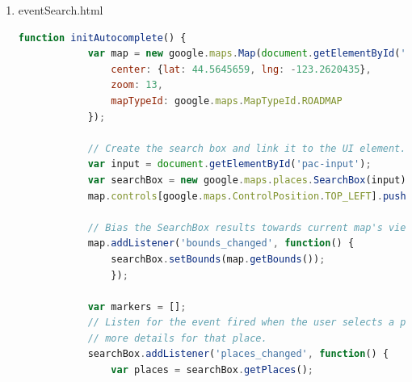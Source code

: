 \documentclass[letterpaper,10pt,onecolumn]{IEEEtran} %
\begin{document}
\begin{enumerate}
\begin{center}
\begin{lstlisting}[language=Python]
        url = "https://api.meetup.com/2/open_events?&sign=true&photo-host=public&state=ky&city=lexington&country=usa&topic=" + hashtag.name + "&radius=10000&sign=true&key=" + MEETUP_API_KEY

         try:
             #getting location of the events instead of groups show below - Justin Bruntmyer
             if 'venue' in meetup.keys():
                 if 'city' in meetup['venue'].keys():
                     event.city = meetup['venue']['city']
                 if 'country' in meetup['venue'].keys():
                     event.country = meetup['venue']['country']
                 if 'state' in meetup['venue'].keys():
                     event.state = meetup['venue']['state']
                 if 'address_1' in meetup['venue'].keys():
                     event.address_1 = meetup['venue']['address_1']
                 if 'lat' in meetup['venue'].keys():
                     event.latitude = meetup['venue']['lat']
                 if 'lon' in meetup['venue'].keys():
                     event.longitude = meetup['venue']['lon']
            #end getting locaiton info - Justin Bruntmyer
      \end{lstlisting}
    \end{center}

  \item eventSearch.html
    \begin{center}
      \begin{lstlisting}[language=JavaScript]
        function initAutocomplete() {
            var map = new google.maps.Map(document.getElementById('map'), {
                center: {lat: 44.5645659, lng: -123.2620435},
                zoom: 13,
                mapTypeId: google.maps.MapTypeId.ROADMAP
            });

            // Create the search box and link it to the UI element.
            var input = document.getElementById('pac-input');
            var searchBox = new google.maps.places.SearchBox(input);
            map.controls[google.maps.ControlPosition.TOP_LEFT].push(input);

            // Bias the SearchBox results towards current map's viewport.
            map.addListener('bounds_changed', function() {
                searchBox.setBounds(map.getBounds());
                });

            var markers = [];
            // Listen for the event fired when the user selects a prediction and retrieve
            // more details for that place.
            searchBox.addListener('places_changed', function() {
                var places = searchBox.getPlaces();


\end{lstlisting}
\end{center}
\end{enumerate}
\end{document}
